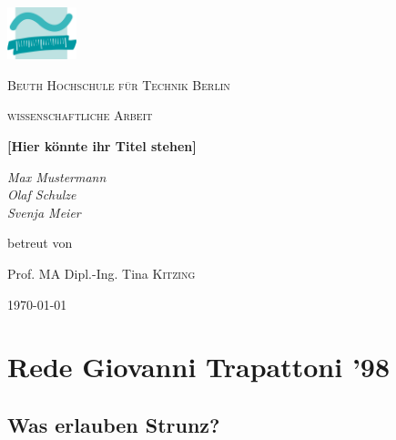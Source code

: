 
\begin{titlepage}
	\centering
	\includegraphics[width=0.15\textwidth]{img/beuth.png}\par\vspace{1cm}
	{\scshape\LARGE Beuth Hochschule für Technik Berlin \par}
	\vspace{1cm}
	{\scshape\Large wissenschaftliche Arbeit\par}
	\vspace{1.5cm}
	{\huge\bfseries [Hier könnte ihr Titel stehen]\par}
	\vspace{2cm}
	{\Large\itshape Max Mustermann\\Olaf Schulze\\Svenja Meier\par}
	\vfill
	betreut von\par
	Prof. MA Dipl.-Ing. Tina \textsc{Kitzing}

	\vfill
	
	{\large \today\par} %
\end{titlepage}

\begin{abstract} \noindent\RaggedRight\normalsize
Diese Dokumentation enthält eine sortierte Liste der wichtigsten
\LaTeX--Befehle. Die einzelnen Listeneintr"age sind untereinander
durch viele Querverweise verkettet, die ein Auffinden inhaltlich
zusammengeöriger Informationen erheblich erleichtern.
\end{abstract}

\clearpage
\printnoidxglossaries

\clearpage
\tableofcontents
\clearpage

\section{Rede Giovanni Trapattoni '98} %

\subsection{Was erlauben Strunz?} %


